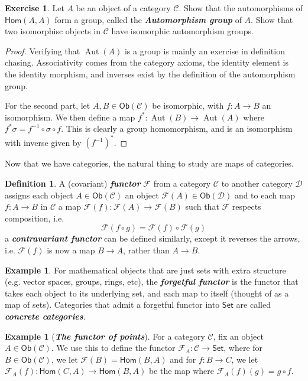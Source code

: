 \documentclass[psamsfonts]{amsart}
\theoremstyle{definition}
\newtheorem{defn}[thm]{Definition}
\newtheorem{exmp}[thm]{Example}
\newtheorem{exer}[thm]{Exercise}
\theoremstyle{remark}
\renewcommand{\hom}{\mathsf{Hom}}
\newcommand{\ib}[1]{\textbf{\textit{#1}}}
\newcommand{\inv}{^{-1}}
\DeclareMathOperator{\Aut}{Aut}
\begin{document}
%
\begin{exer}
Let $A$ be an object of a category $\mathscr{C}$. Show that the automorphisms of $\hom(A,A)$ form a group, called the \ib{Automorphism group} of $A$. Show that two isomorphisc objects in $\mathscr{C}$ have isomorphic automorphism groups.
\end{exer}
%
\begin{proof}
Verifying that $\Aut(A)$ is a group is mainly an exercise in definition chasing. Associativity comes from the category axioms, the identity element is the identity morphism, and inverses exist by the definition of the automorphism group. 

For the second part, let $A,B \in \mathsf{Ob}(\mathscr{C})$ be isomorphic, with $f: A \to B$ an isomorphism. We then define a map $f^*: \Aut(B) \to \Aut(A)$ where $f^*\sigma = f\inv \circ \sigma \circ f$. This is clearly a group homomorphism, and is an isomorphism with inverse given by $(f\inv)^*$.
\end{proof}
%
Now that we have categories, the natural thing to study are maps of categories.
%
\begin{defn}
A (covariant) \ib{functor} $\mathcal{F}$ from a category $\mathscr{C}$ to another category $\mathscr{D}$ assigns each object $A \in \mathsf{Ob}(\mathscr{C})$ an object $\mathcal{F}(A) \in \mathsf{Ob}(\mathscr{D})$ and to each map $f:A \to B$ in $\mathscr{C}$ a map $\mathcal{F}(f) : \mathcal{F}(A) \to \mathcal{F}(B)$ such that $\mathcal{F}$ respects composition, i.e.
$$\mathcal{F}(f \circ g) = \mathcal{F}(f) \circ \mathcal{F}(g) $$
a \ib{contravariant functor} can be defined similarly, except it reverses the arrows, i.e. $\mathcal{F}(f)$ is now a map $B \to A$, rather than $A \to B$.
\end{defn}
%
\begin{exmp}
For mathematical objects that are just sets with extra structure (e.g. vector spaces, groups, rings, etc), the \ib{forgetful functor} is the functor that takes each object to its underlying set, and each map to itself (thought of as a map of sets). Categories that admit a forgetful functor into $\mathsf{Set}$ are called \ib{concrete categories}.
\end{exmp}
%
\begin{exmp}[\ib{The functor of points}]
For a category $\mathscr{C}$, fix an object $A \in \mathsf{Ob}(\mathscr{C})$. We use this to define the functor $\mathcal{F}_A: \mathscr{C} \to \mathsf{Set}$, where for $B \in \mathsf{Ob}(\mathscr{C})$, we let $\mathcal{F}(B) = \hom(B,A)$ and for $f: B \to C$, we let $\mathcal{F}_A(f): \hom(C,A) \to \hom(B,A)$ be the map where $\mathcal{F}_A(f)(g) = g \circ f$.
\end{exmp}
\end{document}
